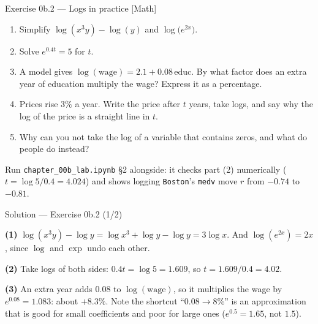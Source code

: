 \documentclass[aspectratio=169,11pt]{beamer}
\begin{document}
\begin{frame}{Exercise 0b.2 --- Logs in practice [Math]}
  \begin{exercise}
    \begin{enumerate}
      \item Simplify $\log(x^3 y) - \log(y)$ and $\log\!\bigl(e^{2x}\bigr)$.
      \item Solve $e^{0.4t} = 5$ for $t$.
      \item A model gives $\log(\text{wage}) = 2.1 + 0.08\,\text{educ}$.
            By what factor does an extra year of education multiply the wage?
            Express it as a percentage.
      \item Prices rise $3\%$ a year. Write the price after $t$ years, take
            logs, and say why the log of the price is a straight line in $t$.
      \item Why can you not take the log of a variable that contains zeros,
            and what do people do instead?
    \end{enumerate}
  \end{exercise}
  \begin{labnote}
    Run \texttt{chapter\_00b\_lab.ipynb} \S2 alongside: it checks part (2)
    numerically ($t = \log 5/0.4 = 4.024$) and shows logging \texttt{Boston}'s
    \texttt{medv} move $r$ from $-0.74$ to $-0.81$.
  \end{labnote}
\end{frame}

\begin{frame}{Solution --- Exercise 0b.2 (1/2)}
  \begin{solutionbox}
    \textbf{(1)} $\log(x^3y) - \log y = \log x^3 + \log y - \log y =
    3\log x$. And $\log(e^{2x}) = 2x$, since $\log$ and $\exp$ undo each
    other.

    \textbf{(2)} Take logs of both sides: $0.4t = \log 5 = 1.609$, so
    $t = 1.609/0.4 = \mathbf{4.02}$.

    \textbf{(3)} An extra year adds $0.08$ to $\log(\text{wage})$, so it
    multiplies the wage by $e^{0.08} = 1.083$: about $\mathbf{+8.3\%}$. Note
    the shortcut ``$0.08 \to 8\%$'' is an approximation that is good for small
    coefficients and poor for large ones ($e^{0.5} = 1.65$, not $1.5$).
  \end{solutionbox}
\end{frame}
\end{document}
